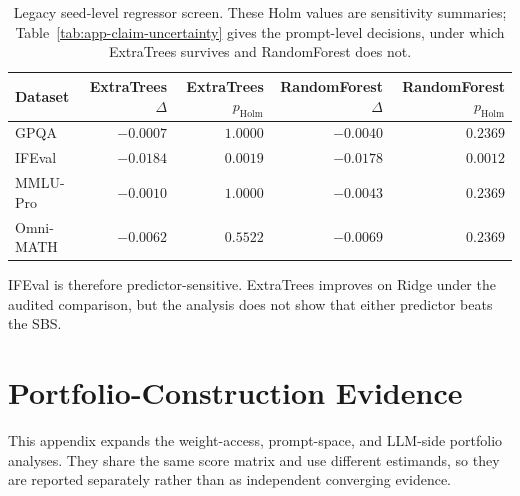 \documentclass{article}
\begin{document}
\begin{table}[h]
  \caption{Legacy seed-level regressor screen. These Holm values are sensitivity summaries; Table~\ref{tab:app-claim-uncertainty} gives the prompt-level decisions, under which ExtraTrees survives and RandomForest does not.}
  \label{tab:app-regressor}
  \centering
  \small
  \begin{tabular}{lrrrr}
    \toprule
    Dataset & ExtraTrees $\Delta$ & ExtraTrees $p_{\text{Holm}}$ & RandomForest $\Delta$ & RandomForest $p_{\text{Holm}}$ \\
    \midrule
    GPQA & $-0.0007$ & $1.0000$ & $-0.0040$ & $0.2369$ \\
    IFEval & $-0.0184$ & $0.0019$ & $-0.0178$ & $0.0012$ \\
    MMLU-Pro & $-0.0010$ & $1.0000$ & $-0.0043$ & $0.2369$ \\
    Omni-MATH & $-0.0062$ & $0.5522$ & $-0.0069$ & $0.2369$ \\
    \bottomrule
  \end{tabular}
\end{table}

IFEval is therefore predictor-sensitive. ExtraTrees improves on Ridge under the audited comparison, but the analysis does not show that either predictor beats the SBS.

\section{Portfolio-Construction Evidence}
\label{app:portfolio-warehouse}

This appendix expands the weight-access, prompt-space, and LLM-side portfolio analyses. They share the same score matrix and use different estimands, so they are reported separately rather than as independent converging evidence.
\end{document}
